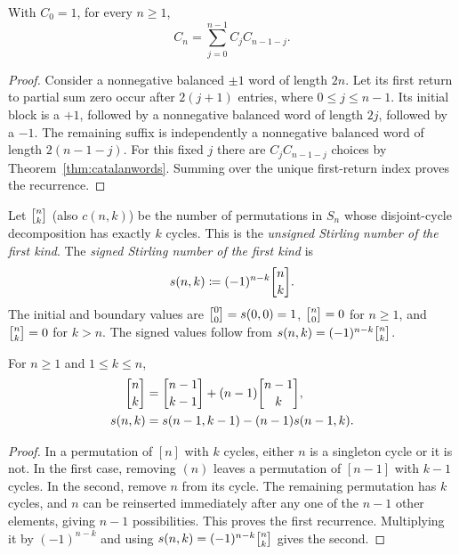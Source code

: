 \documentclass[11pt, oneside]{article}
\begin{document}
\begin{theorem}\label{thm:catalanrec}
With $C_0=1$, for every $n\ge1$,
\[
C_n=\sum_{j=0}^{n-1}C_jC_{n-1-j}.
\]
\end{theorem}
\begin{proof}
Consider a nonnegative balanced $\pm1$ word of length $2n$. Let its first return to partial sum zero occur after $2(j+1)$ entries, where $0\le j\le n-1$. Its initial block is a $+1$, followed by a nonnegative balanced word of length $2j$, followed by a $-1$. The remaining suffix is independently a nonnegative balanced word of length $2(n-1-j)$. For this fixed $j$ there are $C_jC_{n-1-j}$ choices by Theorem~\ref{thm:catalanwords}. Summing over the unique first-return index proves the recurrence.
\end{proof}

\begin{definition}
Let $\stirone{n}{k}$ (also $c(n, k)$) be the number of permutations in $S_n$ whose disjoint-cycle decomposition has exactly $k$ cycles. This is the \emph{unsigned Stirling number of the first kind}. The \emph{signed Stirling number of the first kind} is
\[
s(n, k)\coloneqq(-1)^{n-k}\stirone{n}{k}.
\]
The initial and boundary values are $\stirone{0}{0}=s(0, 0)=1$, $\stirone{n}{0}=0$ for $n\ge1$, and $\stirone{n}{k}=0$ for $k>n$. The signed values follow from $s(n, k)=(-1)^{n-k}\stirone{n}{k}$.
\end{definition}
\begin{proposition}\label{prop:stirlingfirst}
For $n\ge1$ and $1\le k\le n$,
\[
\begin{aligned}
\stirone{n}{k}&=\stirone{n-1}{k-1}+(n-1)\stirone{n-1}{k}, \\
s(n, k)&=s(n-1, k-1)-(n-1)s(n-1, k).
\end{aligned}
\]
\end{proposition}
\begin{proof}
In a permutation of $[n]$ with $k$ cycles, either $n$ is a singleton cycle or it is not. In the first case, removing $(n)$ leaves a permutation of $[n-1]$ with $k-1$ cycles. In the second, remove $n$ from its cycle. The remaining permutation has $k$ cycles, and $n$ can be reinserted immediately after any one of the $n-1$ other elements, giving $n-1$ possibilities. This proves the first recurrence. Multiplying it by $(-1)^{n-k}$ and using $s(n, k)=(-1)^{n-k}\stirone{n}{k}$ gives the second.
\end{proof}
\end{document}
